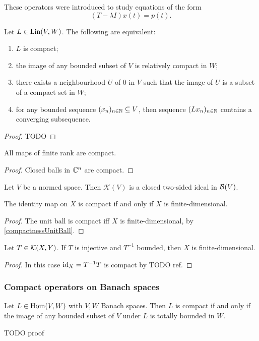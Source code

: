 These operators were introduced to study equations of the form
\[ (T-\lambda I)x(t) = p(t). \]

\begin{proposition}
Let $L\in\operatorname{Lin}(V,W)$. The following are equivalent:
\begin{enumerate}
\item $L$ is compact;
\item the image of any bounded subset of $V$ is relatively compact in $W$;
\item there exists a neighbourhood $U$ of $0$ in $V$ such that the image of $U$ is a subset of a compact set in $W$;
\item for any bounded sequence $(x_n)_{n\in\mathbb{N}} \subseteq V$, then sequence $(Lx_n)_{n\in\mathbb{N}}$ contains a converging subsequence.
\end{enumerate}
\end{proposition}
\begin{proof}
TODO
\end{proof}
\begin{corollary}
All maps of finite rank are compact.
\end{corollary}
\begin{proof}
Closed balls in $\mathbb{C}^n$ are compact.
\end{proof}

\begin{proposition}
Let $V$ be a normed space. Then $\mathcal{K}(V)$ is a closed two-sided ideal in $\operatorname{\mathcal{B}}(V)$.
\end{proposition}

\begin{lemma}
The identity map on $X$ is compact \textup{if and only if} $X$ is finite-dimensional.
\end{lemma}
\begin{proof}
The unit ball is compact iff $X$ is finite-dimensional, by \ref{compactnessUnitBall}.
\end{proof}
\begin{corollary}
Let $T\in\operatorname{\mathcal{K}}(X,Y)$. If $T$ is injective and $T^{-1}$ bounded, then $X$ is finite-dimensional.
\end{corollary}
\begin{proof}
In this case $\operatorname{id}_X = T^{-1}T$ is compact by TODO ref.
\end{proof}

\subsubsection{Compact operators on Banach spaces}
\begin{proposition}
Let $L\in\operatorname{Hom}(V,W)$ with $V,W$ Banach spaces. Then $L$ is compact \textup{if and only if} the image of any bounded subset of $V$ under $L$ is totally bounded in $W$.
\end{proposition}
TODO proof

